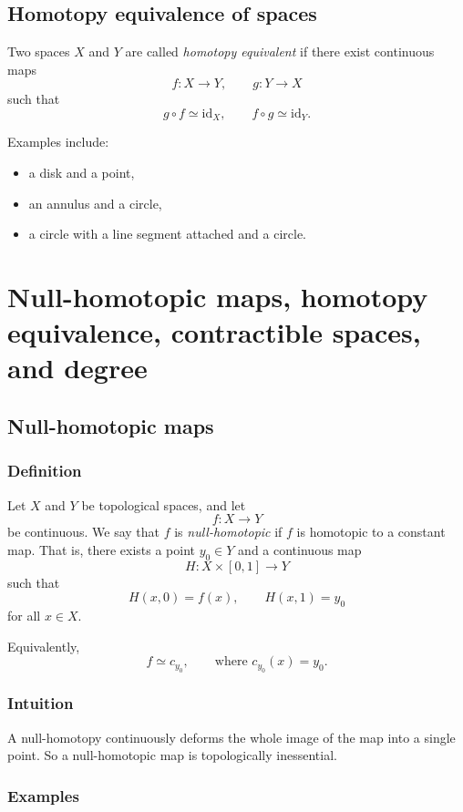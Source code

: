 \documentclass[12pt,a4paper]{article}
\theoremstyle{notespace}
\begin{document}
\subsection{Homotopy equivalence of spaces}

Two spaces \(X\) and \(Y\) are called \emph{homotopy equivalent} if there exist continuous maps
\[
f:X\to Y,
\qquad
g:Y\to X
\]
such that
\[
g\circ f\simeq \mathrm{id}_X,
\qquad
f\circ g\simeq \mathrm{id}_Y.
\]

Examples include:
\begin{itemize}
	\item a disk and a point,
	\item an annulus and a circle,
	\item a circle with a line segment attached and a circle.
\end{itemize}

\section{Null-homotopic maps, homotopy equivalence, contractible spaces, and degree}

\subsection{Null-homotopic maps}

\subsubsection*{Definition}

Let \(X\) and \(Y\) be topological spaces, and let
\[
f:X\to Y
\]
be continuous. We say that \(f\) is \emph{null-homotopic} if \(f\) is homotopic to a constant map. That is, there exists a point \(y_0\in Y\) and a continuous map
\[
H:X\times[0,1]\to Y
\]
such that
\[
H(x,0)=f(x),\qquad H(x,1)=y_0
\]
for all \(x\in X\).

Equivalently,
\[
f\simeq c_{y_0},
\qquad\text{where }c_{y_0}(x)=y_0.
\]

\subsubsection*{Intuition}

A null-homotopy continuously deforms the whole image of the map into a single point. So a null-homotopic map is topologically inessential.

\subsubsection*{Examples}
\end{document}
